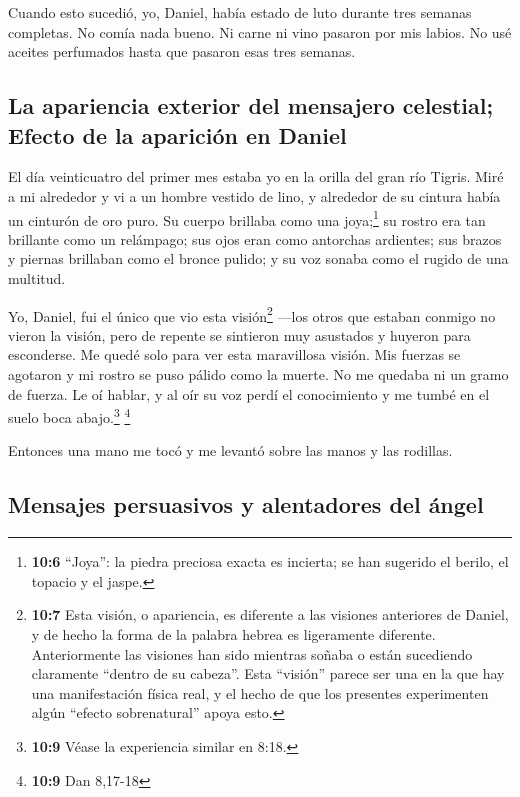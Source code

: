  Cuando esto sucedió, yo, Daniel, había estado de luto
durante tres semanas completas.  No comía nada bueno. Ni
carne ni vino pasaron por mis labios. No usé aceites perfumados hasta
que pasaron esas tres semanas.

\hypertarget{la-apariencia-exterior-del-mensajero-celestial-efecto-de-la-apariciuxf3n-en-daniel}{%
\subsection{La apariencia exterior del mensajero celestial; Efecto de la
aparición en
Daniel}\label{la-apariencia-exterior-del-mensajero-celestial-efecto-de-la-apariciuxf3n-en-daniel}}

 El día veinticuatro del primer mes estaba yo en la orilla
del gran río Tigris.  Miré a mi alrededor y vi a un hombre
vestido de lino, y alrededor de su cintura había un cinturón de oro
puro.  Su cuerpo brillaba como una joya;\footnote{\textbf{10:6}
  ``Joya'': la piedra preciosa exacta es incierta; se han sugerido el
  berilo, el topacio y el jaspe.} su rostro era tan brillante como un
relámpago; sus ojos eran como antorchas ardientes; sus brazos y piernas
brillaban como el bronce pulido; y su voz sonaba como el rugido de una
multitud.

 Yo, Daniel, fui el único que vio esta visión\footnote{\textbf{10:7}
  Esta visión, o apariencia, es diferente a las visiones anteriores de
  Daniel, y de hecho la forma de la palabra hebrea es ligeramente
  diferente. Anteriormente las visiones han sido mientras soñaba o están
  sucediendo claramente ``dentro de su cabeza''. Esta ``visión'' parece
  ser una en la que hay una manifestación física real, y el hecho de que
  los presentes experimenten algún ``efecto sobrenatural'' apoya esto.}
---los otros que estaban conmigo no vieron la visión, pero de repente se
sintieron muy asustados y huyeron para esconderse.  Me
quedé solo para ver esta maravillosa visión. Mis fuerzas se agotaron y
mi rostro se puso pálido como la muerte. No me quedaba ni un gramo de
fuerza.  Le oí hablar, y al oír su voz perdí el
conocimiento y me tumbé en el suelo boca abajo.\footnote{\textbf{10:9}
  Véase la experiencia similar en 8:18.} \footnote{\textbf{10:9} Dan
  8,17-18}

 Entonces una mano me tocó y me levantó sobre las manos y
las rodillas.

\hypertarget{mensajes-persuasivos-y-alentadores-del-uxe1ngel}{%
\subsection{Mensajes persuasivos y alentadores del
ángel}\label{mensajes-persuasivos-y-alentadores-del-uxe1ngel}}

